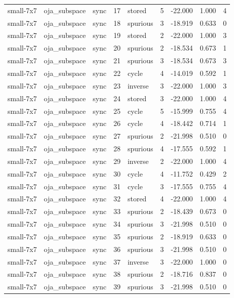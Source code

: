\begin{tabular}{lllrlrrrr}
small-7x7 & oja\_subspace & sync & 17 & stored & 5 & -22.000 & 1.000 & 4 \\
small-7x7 & oja\_subspace & sync & 18 & spurious & 3 & -18.919 & 0.633 & 0 \\
small-7x7 & oja\_subspace & sync & 19 & stored & 2 & -22.000 & 1.000 & 3 \\
small-7x7 & oja\_subspace & sync & 20 & spurious & 2 & -18.534 & 0.673 & 1 \\
small-7x7 & oja\_subspace & sync & 21 & spurious & 3 & -18.534 & 0.673 & 3 \\
small-7x7 & oja\_subspace & sync & 22 & cycle & 4 & -14.019 & 0.592 & 1 \\
small-7x7 & oja\_subspace & sync & 23 & inverse & 3 & -22.000 & 1.000 & 3 \\
small-7x7 & oja\_subspace & sync & 24 & stored & 3 & -22.000 & 1.000 & 4 \\
small-7x7 & oja\_subspace & sync & 25 & cycle & 5 & -15.999 & 0.755 & 4 \\
small-7x7 & oja\_subspace & sync & 26 & cycle & 4 & -18.442 & 0.714 & 1 \\
small-7x7 & oja\_subspace & sync & 27 & spurious & 2 & -21.998 & 0.510 & 0 \\
small-7x7 & oja\_subspace & sync & 28 & spurious & 4 & -17.555 & 0.592 & 1 \\
small-7x7 & oja\_subspace & sync & 29 & inverse & 2 & -22.000 & 1.000 & 4 \\
small-7x7 & oja\_subspace & sync & 30 & cycle & 4 & -11.752 & 0.429 & 2 \\
small-7x7 & oja\_subspace & sync & 31 & cycle & 3 & -17.555 & 0.755 & 4 \\
small-7x7 & oja\_subspace & sync & 32 & stored & 4 & -22.000 & 1.000 & 4 \\
small-7x7 & oja\_subspace & sync & 33 & spurious & 2 & -18.439 & 0.673 & 0 \\
small-7x7 & oja\_subspace & sync & 34 & spurious & 3 & -21.998 & 0.510 & 0 \\
small-7x7 & oja\_subspace & sync & 35 & spurious & 2 & -18.919 & 0.633 & 0 \\
small-7x7 & oja\_subspace & sync & 36 & spurious & 3 & -21.998 & 0.510 & 0 \\
small-7x7 & oja\_subspace & sync & 37 & inverse & 3 & -22.000 & 1.000 & 0 \\
small-7x7 & oja\_subspace & sync & 38 & spurious & 2 & -18.716 & 0.837 & 0 \\
small-7x7 & oja\_subspace & sync & 39 & spurious & 3 & -21.998 & 0.510 & 0 \\

\end{tabular}

